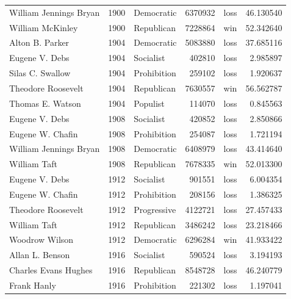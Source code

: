\documentclass[
  letterpaper,
  DIV=11,
  numbers=noendperiod]{scrreprt}
\begin{document}
\begin{tabular}{lrlrlr}
William Jennings Bryan &  1900 &             Democratic &       6370932 &   loss &  46.130540 \\
William McKinley       &  1900 &             Republican &       7228864 &    win &  52.342640 \\
Alton B. Parker        &  1904 &             Democratic &       5083880 &   loss &  37.685116 \\
Eugene V. Debs         &  1904 &              Socialist &        402810 &   loss &   2.985897 \\
Silas C. Swallow       &  1904 &            Prohibition &        259102 &   loss &   1.920637 \\
Theodore Roosevelt     &  1904 &             Republican &       7630557 &    win &  56.562787 \\
Thomas E. Watson       &  1904 &               Populist &        114070 &   loss &   0.845563 \\
Eugene V. Debs         &  1908 &              Socialist &        420852 &   loss &   2.850866 \\
Eugene W. Chafin       &  1908 &            Prohibition &        254087 &   loss &   1.721194 \\
William Jennings Bryan &  1908 &             Democratic &       6408979 &   loss &  43.414640 \\
William Taft           &  1908 &             Republican &       7678335 &    win &  52.013300 \\
Eugene V. Debs         &  1912 &              Socialist &        901551 &   loss &   6.004354 \\
Eugene W. Chafin       &  1912 &            Prohibition &        208156 &   loss &   1.386325 \\
Theodore Roosevelt     &  1912 &            Progressive &       4122721 &   loss &  27.457433 \\
William Taft           &  1912 &             Republican &       3486242 &   loss &  23.218466 \\
Woodrow Wilson         &  1912 &             Democratic &       6296284 &    win &  41.933422 \\
Allan L. Benson        &  1916 &              Socialist &        590524 &   loss &   3.194193 \\
Charles Evans Hughes   &  1916 &             Republican &       8548728 &   loss &  46.240779 \\
Frank Hanly            &  1916 &            Prohibition &        221302 &   loss &   1.197041 \\

\end{tabular}
\end{document}
